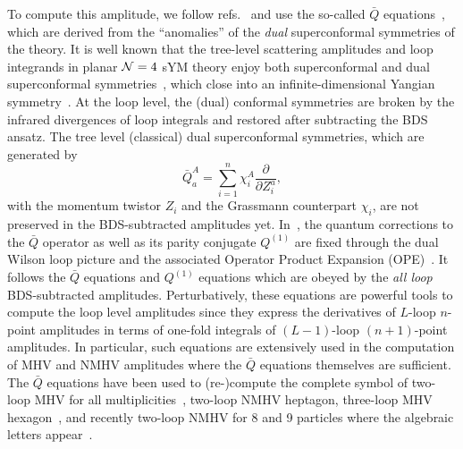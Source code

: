 \documentclass[a4paper,12pt]{article}
\begin{document}
To compute this amplitude, we follow refs.~\cite{Zhang:2019vnm,He:2020vob} and use the so-called $\bar{Q}$ equations~\cite{CaronHuot:2011kk}, which are derived from the ``anomalies'' of the \emph{dual} superconformal symmetries of the theory.   
It is well known that the tree-level scattering amplitudes and loop integrands in planar ${\cal N}=4$ sYM theory enjoy both superconformal and dual superconformal symmetries~\cite{Drummond:2006rz,Drummond:2008vq,Korchemsky:2010ut}, which close into an infinite-dimensional Yangian symmetry~\cite{Drummond:2009fd}. At the loop level, the (dual) conformal symmetries are broken by the infrared divergences of loop integrals and restored after subtracting the BDS ansatz. The tree level (classical) dual superconformal symmetries, which are generated by
\begin{equation}
    \bar{Q}_{a}^{A}= \sum_{i=1}^n \chi_{i}^{A}\frac{\partial}{\partial Z_{i}^{a}} ,
\end{equation}
with the momentum twistor $Z_{i}$ and the Grassmann counterpart $\chi_{i}$,
are not preserved in the BDS-subtracted amplitudes yet. In~\cite{CaronHuot:2011kk}, the quantum corrections to the $\bar{Q}$ operator as well as its parity conjugate $Q^{(1)}$ are fixed through the dual Wilson loop picture and the associated Operator Product Expansion (OPE)~\cite{Alday:2010ku}. It follows the $\bar{Q}$ equations and $Q^{(1)}$ equations which are obeyed by the \emph{all loop} BDS-subtracted amplitudes.
Perturbatively, these equations are powerful tools to compute the loop level amplitudes since they express the derivatives of $L$-loop $n$-point amplitudes in terms of one-fold integrals of $(L{-}1)$-loop $(n{+}1)$-point amplitudes. 
In particular, such equations are extensively used in the computation of MHV and NMHV amplitudes where the $\bar{Q}$ equations themselves are sufficient. The $\bar{Q}$ equations have been used to (re-)compute the complete symbol of two-loop MHV for all multiplicities~\cite{CaronHuot:2011ky}, two-loop NMHV heptagon, three-loop MHV hexagon~\cite{CaronHuot:2011kk}, and recently two-loop NMHV for 8 and 9 particles where the algebraic letters appear~\cite{Zhang:2019vnm,He:2020vob}.
\end{document}
